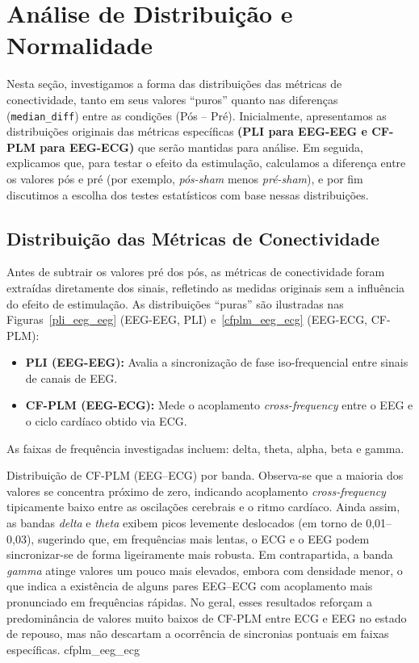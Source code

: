 \chapter{Análise de Distribuição e Normalidade}
\label{chap:analise_distribuicao_normalidade}
Nesta seção, investigamos a forma das distribuições das métricas de conectividade, tanto em seus valores ``puros'' quanto nas diferenças (\texttt{median\_diff}) entre as condições (Pós – Pré). Inicialmente, apresentamos as distribuições originais das métricas específicas \textbf{(PLI para EEG-EEG e CF-PLM para EEG-ECG)} que serão mantidas para análise. Em seguida, explicamos que, para testar o efeito da estimulação, calculamos a diferença entre os valores pós e pré (por exemplo, \emph{pós-sham} menos \emph{pré-sham}), e por fim discutimos a escolha dos testes estatísticos com base nessas distribuições.

\section{Distribuição das Métricas de Conectividade}
Antes de subtrair os valores pré dos pós, as métricas de conectividade foram extraídas diretamente dos sinais, refletindo as medidas originais sem a influência do efeito de estimulação. As distribuições ``puras'' são ilustradas nas Figuras~\ref{pli_eeg_eeg} (EEG-EEG, PLI) e~\ref{cfplm_eeg_ecg} (EEG-ECG, CF-PLM):
\begin{itemize}
    \item \textbf{PLI (EEG-EEG):} Avalia a sincronização de fase iso-frequencial entre sinais de canais de EEG.
    \item \textbf{CF-PLM (EEG-ECG):} Mede o acoplamento \textit{cross-frequency} entre o EEG e o ciclo cardíaco obtido via ECG.
\end{itemize}

As faixas de frequência investigadas incluem: delta, theta, alpha, beta e gamma.

{Distribuição de CF-PLM (EEG--ECG) por banda. Observa-se que a maioria dos valores se concentra próximo de zero, indicando acoplamento \textit{cross-frequency} tipicamente baixo entre as oscilações cerebrais e o ritmo cardíaco. Ainda assim, as bandas \emph{delta} e \emph{theta} exibem picos levemente deslocados (em torno de 0,01--0,03), sugerindo que, em frequências mais lentas, o ECG e o EEG podem sincronizar-se de forma ligeiramente mais robusta. Em contrapartida, a banda \emph{gamma} atinge valores um pouco mais elevados, embora com densidade menor, o que indica a existência de alguns pares EEG--ECG com acoplamento mais pronunciado em frequências rápidas. No geral, esses resultados reforçam a predominância de valores muito baixos de CF-PLM entre ECG e EEG no estado de repouso, mas não descartam a ocorrência de sincronias pontuais em faixas específicas.}
{cfplm_eeg_ecg}

